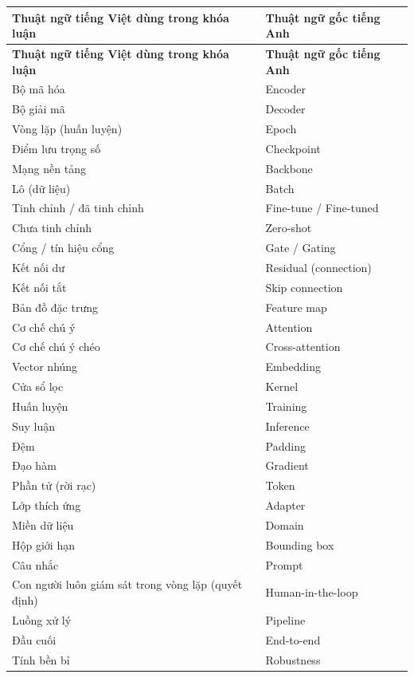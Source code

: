 \begin{longtable}{|>{\raggedright\arraybackslash}p{5.2cm}|p{8.8cm}|}
\hline
\textbf{Thuật ngữ tiếng Việt dùng trong khóa luận} & \textbf{Thuật ngữ gốc tiếng Anh} \\
\hline
\endfirsthead
\hline
\textbf{Thuật ngữ tiếng Việt dùng trong khóa luận} & \textbf{Thuật ngữ gốc tiếng Anh} \\
\hline
\endhead
Bộ mã hóa & Encoder \\ \hline
Bộ giải mã & Decoder \\ \hline
Vòng lặp (huấn luyện) & Epoch \\ \hline
Điểm lưu trọng số & Checkpoint \\ \hline
Mạng nền tảng & Backbone \\ \hline
Lô (dữ liệu) & Batch \\ \hline
Tinh chỉnh / đã tinh chỉnh & Fine-tune / Fine-tuned \\ \hline
Chưa tinh chỉnh & Zero-shot \\ \hline
Cổng / tín hiệu cổng & Gate / Gating \\ \hline
Kết nối dư & Residual (connection) \\ \hline
Kết nối tắt & Skip connection \\ \hline
Bản đồ đặc trưng & Feature map \\ \hline
Cơ chế chú ý & Attention \\ \hline
Cơ chế chú ý chéo & Cross-attention \\ \hline
Vector nhúng & Embedding \\ \hline
Cửa sổ lọc & Kernel \\ \hline
Huấn luyện & Training \\ \hline
Suy luận & Inference \\ \hline
Đệm & Padding \\ \hline
Đạo hàm & Gradient \\ \hline
Phần tử (rời rạc) & Token \\ \hline
Lớp thích ứng & Adapter \\ \hline
Miền dữ liệu & Domain \\ \hline
Hộp giới hạn & Bounding box \\ \hline
Câu nhắc & Prompt \\ \hline
Con người luôn giám sát trong vòng lặp (quyết định) & Human-in-the-loop \\ \hline
Luồng xử lý & Pipeline \\ \hline
Đầu cuối & End-to-end \\ \hline
Tính bền bỉ & Robustness \\ \hline

\end{longtable}

